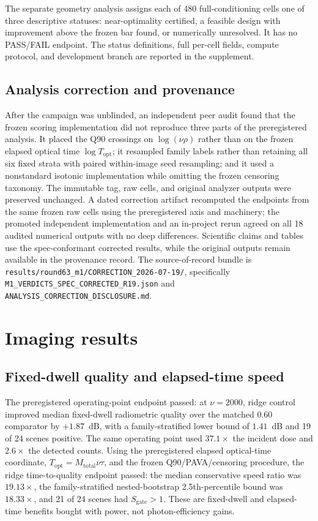 \documentclass[10pt,twocolumn]{article}
\begin{document}
The separate geometry analysis assigns each of 480 full-conditioning cells one
of three descriptive statuses: near-optimality certified, a feasible design
with improvement above the frozen bar found, or numerically unresolved. It has
no PASS/FAIL endpoint. The status definitions, full per-cell fields, compute
protocol, and development branch are reported in the supplement.

\subsection{Analysis correction and provenance}
After the campaign was unblinded, an independent
peer audit found that the frozen scoring implementation did not reproduce three
parts of the preregistered analysis. It placed the Q90 crossings on
$\log(\nu\rho)$ rather than on the frozen elapsed optical time
$\log T_{\mathrm{opt}}$; it resampled family labels rather than retaining all
six fixed strata with paired within-image seed resampling; and it used a
nonstandard isotonic implementation while omitting the frozen censoring
taxonomy. The immutable tag, raw cells, and original analyzer outputs were
preserved unchanged. A dated correction artifact recomputed the endpoints from
the same frozen raw cells using the preregistered axis and machinery; the
promoted independent implementation and an in-project rerun agreed on all 18
audited numerical outputs with no deep differences. Scientific claims and tables
use the spec-conformant corrected results, while the original outputs remain
available in the provenance record. The source-of-record bundle is
\texttt{results/round63\_m1/CORRECTION\_2026-07-19/}, specifically
\texttt{M1\_VERDICTS\_SPEC\_CORRECTED\_R19.json} and
\texttt{ANALYSIS\_CORRECTION\_DISCLOSURE.md}.

\section{Imaging results}
\label{sec:results}
\subsection{Fixed-dwell quality and elapsed-time speed}
The preregistered operating-point endpoint passed: at $\nu=2000$, ridge
control improved median fixed-dwell radiometric quality over the matched
$0.60$ comparator by $+1.87$~dB, with a family-stratified lower bound of
$1.41$~dB and 19 of 24 scenes positive. The same operating point used
$37.1\times$ the incident dose and $2.6\times$ the detected counts. Using
the preregistered elapsed optical-time coordinate,
$T_{\mathrm{opt}}=M_{\mathrm{total}}\nu\tau$, and the frozen
Q90/PAVA/censoring procedure, the ridge time-to-quality endpoint passed: the
median conservative speed ratio was $19.13\times$, the family-stratified
nested-bootstrap 2.5th-percentile bound was $18.33\times$, and 21 of 24
scenes had $S_{\mathrm{gate}}>1$. These are fixed-dwell and elapsed-time
benefits bought with power, not photon-efficiency gains.
\end{document}
